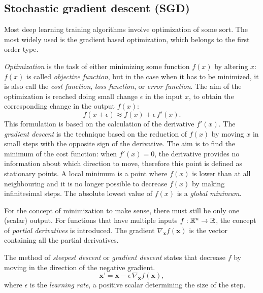 \subsection{Stochastic gradient descent (SGD)}

Most deep learning training algorithms involve optimization of some sort.
The most widely used is the gradient based optimization, which belongs to the first order type.

\textit{Optimization} is the task of either minimizing some function $f(x)$ by altering $x$:
$f(x)$ is called \textit{objective function}, but in the case when it has to be minimized, it is also call the \textit{cost function}, \textit{loss function}, or \textit{error function}.
The aim of the optimization is reached doing small change $\epsilon$ in the input $x$, to obtain the corresponding change in the output $f(x)$:
\begin{equation}
f(x+\epsilon) \approx f(x)+\epsilon\,f'(x).
\end{equation}
This formulation is based on the calculation of the derivative $f'(x)$.
The \textit{gradient descent} is the technique based on the reduction of $f(x)$ by moving $x$ in small steps with the opposite sign of the derivative.
The aim is to find the minimum of the cost function: when $f'(x)=0$, the derivative provides no information about which direction to move, therefore this point is defined as stationary points.
A local minimum is a point where $f(x)$ is lower than at all neighbouring and it is no longer possible to decrease $f(x)$ by making infinitesimal steps.
The absolute lowest value of $f(x)$ is a \textit{global minimum}.

For the concept of minimization to make sense, there must still be only one (scalar) output.
For functions that have multiple inputs $f: {\mathbb{R}}^n \rightarrow {\mathbb{R}}$, the concept of \textit{partial derivatives} is introduced.
The gradient $\nabla_{\mathbf{x}}f(\mathbf{x})$ is the vector containing all the partial derivatives.

The method of \textit{steepest descent} or \textit{gradient descent} states that decrease $f$ by moving in the direction of the negative gradient.
\begin{equation}
\textbf{x'} = \textbf{x} - \epsilon\,\nabla_{\mathbf{x}}f(\mathbf{x}),
\end{equation}
where $\epsilon$ is the \textit{learning rate}, a positive scalar determining the size of the step.

